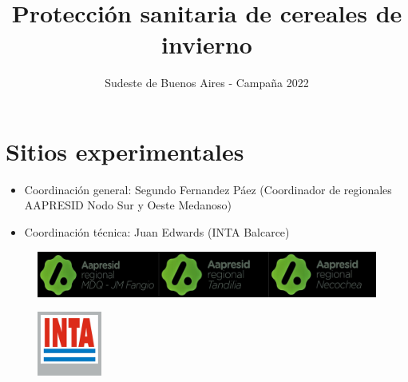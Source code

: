 \documentclass[
  letterpaper,
  DIV=11,
  numbers=noendperiod]{scrreprt}
\title{Protección sanitaria de cereales de invierno}
\subtitle{Sudeste de Buenos Aires - Campaña 2022}
\author{}
\date{}
\providecommand{\tightlist}{%
  \setlength{\itemsep}{0pt}\setlength{\parskip}{0pt}}\usepackage{longtable,booktabs,array}
\renewcommand*\contentsname{Table of contents}
\newcommand\contentsname{Table of contents}
\begin{document}
\maketitle
\ifdefined\Shaded\renewenvironment{Shaded}{\begin{tcolorbox}[enhanced, borderline west={3pt}{0pt}{shadecolor}, interior hidden, breakable, frame hidden, boxrule=0pt, sharp corners]}{\end{tcolorbox}}\fi

\renewcommand*\contentsname{Table of contents}
{
\hypersetup{linkcolor=}
\setcounter{tocdepth}{2}
\tableofcontents
}

\hypertarget{sitios-experimentales}{%
\chapter*{Sitios experimentales}\label{sitios-experimentales}}


\begin{itemize}
\tightlist
\item
  Coordinación general: Segundo Fernandez Páez (Coordinador de
  regionales AAPRESID Nodo Sur y Oeste Medanoso)
\item
  Coordinación técnica: Juan Edwards (INTA Balcarce)
\end{itemize}

\begin{figure}

{\centering \includegraphics{./figs/0_aapre_seba.png}

}

\end{figure}

\begin{figure}

{\centering \includegraphics[width=0.83333in,height=\textheight]{./figs/0_inta.png}

}

\end{figure}
\end{document}
